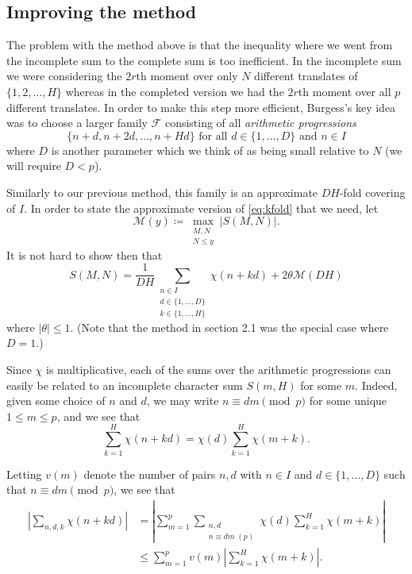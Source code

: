 \documentclass[a4paper,11pt,twoside]{amsart}
\begin{document}
\subsection{Improving the method}
The problem with the method above is that the inequality where we went from the incomplete sum to the complete sum is too inefficient. In the incomplete sum we were considering the $2r$th moment over only $N$ different translates of $\{1,2,\ldots, H\}$ whereas in the completed version we had the $2r$th moment over all $p$ different translates. In order to make this step more efficient, Burgess's key idea was to choose a larger family $\mathcal{F}$ consisting of all \emph{arithmetic progressions}
\[
\{n + d, n+2d, \ldots, n+H d\} \text{ for all $d \in \{1, \ldots, D\}$ and $n \in I$}
\]
where $D$ is another parameter which we think of as being small relative to $N$ (we will require $D < p$).

Similarly to our previous method, this family is an approximate $DH$-fold covering of $I$. In order to state the approximate version of \eqref{eq:kfold} that we need, let
\[
\mathcal{M}(y)  \coloneqq \max_{\substack{M,N \\ N \leq y}} |S(M,N)|.
\]
It is not hard to show then that
\begin{equation} \label{eq:kfold2}
S(M,N) = \frac{1}{DH} \sum_{ \substack{n \in I \\ d \in \{1, \ldots, D\} \\ k \in \{1, \ldots, H\}}} \chi(n+kd) + 2 \theta \mathcal{M}(DH)
\end{equation}
where $|\theta| \leq 1$. (Note that the method in section 2.1 was the special case where $D=1$.)


Since $\chi$ is multiplicative, each of the sums over the arithmetic progressions can easily be related to an incomplete character sum $S(m, H)$ for some $m$. Indeed, given some choice of $n$ and $d$, we may write $n \equiv d m \pmod{p}$ for some unique $1 \leq m \leq p$, and we see that
\[
\sum_{k = 1}^{H} \chi(n+k d) = \chi(d)  \sum_{k = 1}^{H} \chi(m+k).
\]

Letting $v(m)$ denote the number of pairs $n, d$ with $n \in I$ and $d \in \{1, \ldots, D\}$ such that $n \equiv d m \pmod{p}$, we see that
\begin{align}
\left| \sum_{n,d,k} \chi(n+kd) \right| &= \left| \sum_{m = 1}^p \sum_{\substack{n,d \\ n \equiv dm \; (p)}} \chi(d) \sum_{k = 1}^{H} \chi(m+k) \right| \\
&\leq \sum_{m = 1}^p v(m) \left| \sum_{k = 1}^{H} \chi(m+k) \right|. \label{eq:vbd}
\end{align}
\end{document}
